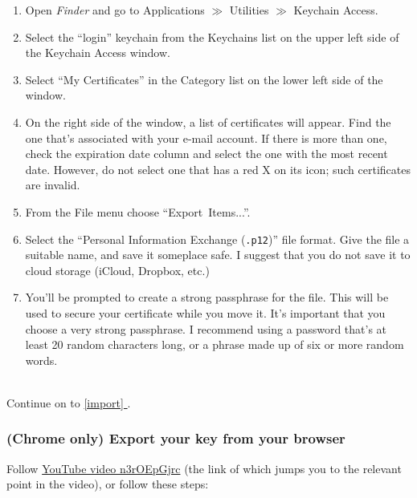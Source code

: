 \documentclass[pdftex,12pt,titlepage=false]{scrartcl}
\newcommand*{\fullref}[1]{\hyperref[{#1}]{\autoref*{#1} \nameref*{#1}}}
\begin{document}
\begin{minipage}{\textwidth}%
  \begin{multicols}{2}
    \begin{enumerate}
    \item Open \emph{Finder} and go to Applications $\gg$ Utilities
      $\gg$ Keychain Access.
    \item Select the ``login'' keychain from the Keychains list on the
      upper left side of the Keychain Access window.
    \item Select ``My Certificates'' in the Category list on the lower
      left side of the window.
    \item On the right side of the window, a list of certificates will
      appear. Find the one that’s associated with your e-mail
      account. If there is more than one, check the expiration date
      column and select the one with the most recent date. However, do
      not select one that has a red X on its icon; such certificates
      are invalid.
    \item From the File menu choose ``Export~Items...''.
    \item Select the ``Personal Information Exchange (\texttt{.p12})''
      file format. Give the file a suitable name, and save it
      someplace safe. I suggest that you do not save it to cloud
      storage (iCloud, Dropbox, etc.)
    \item You'll be prompted to create a strong passphrase for the
      file. This will be used to secure your certificate while you
      move it. It's important that you choose a very strong
      passphrase. I recommend using a password that's at least 20
      random characters long, or a phrase made up of six or more
      random words.
    \end{enumerate}
  \end{multicols}
\end{minipage}\\[1em]

Continue on to \fullref{import}.

\subsubsection{(Chrome only) Export your key from your browser}
Follow \href{https://www.youtube.com/watch?v=n3rOEpGjrc\&start=310}{%
  YouTube video n3rOEpGjrc} (the link of which jumps you to the
relevant point in the video), or follow these steps:
\end{document}
